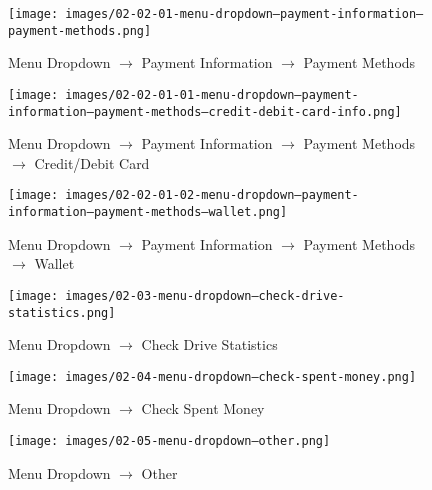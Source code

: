 \documentclass[a4paper, 12pt]{article}
\begin{document}
\begin{figure} [htbp]
  \begin{center}
    \texttt{[image: images/02-02-01-menu-dropdown--payment-information--payment-methods.png]}
  \end{center}
  \caption{Menu Dropdown $\rightarrow$ Payment Information $\rightarrow$ Payment Methods}
\end{figure}

\begin{figure} [htbp]
  \begin{center}
    \texttt{[image: images/02-02-01-01-menu-dropdown--payment-information--payment-methods--credit-debit-card-info.png]}
  \end{center}
  \caption{Menu Dropdown $\rightarrow$ Payment Information $\rightarrow$ Payment Methods $\rightarrow$ Credit/Debit Card}
\end{figure}

\begin{figure} [htbp]
  \begin{center}
    \texttt{[image: images/02-02-01-02-menu-dropdown--payment-information--payment-methods--wallet.png]}
  \end{center}
  \caption{Menu Dropdown $\rightarrow$ Payment Information $\rightarrow$ Payment Methods $\rightarrow$ Wallet}
\end{figure}

\begin{figure} [htbp]
  \begin{center}
    \texttt{[image: images/02-03-menu-dropdown--check-drive-statistics.png]}
  \end{center}
  \caption{Menu Dropdown $\rightarrow$ Check Drive Statistics}
\end{figure}

\begin{figure} [htbp]
  \begin{center}
    \texttt{[image: images/02-04-menu-dropdown--check-spent-money.png]}
  \end{center}
  \caption{Menu Dropdown $\rightarrow$ Check Spent Money}
\end{figure}

\begin{figure} [htbp]
  \begin{center}
    \texttt{[image: images/02-05-menu-dropdown--other.png]}
  \end{center}
  \caption{Menu Dropdown $\rightarrow$ Other}
\end{figure}
\end{document}

